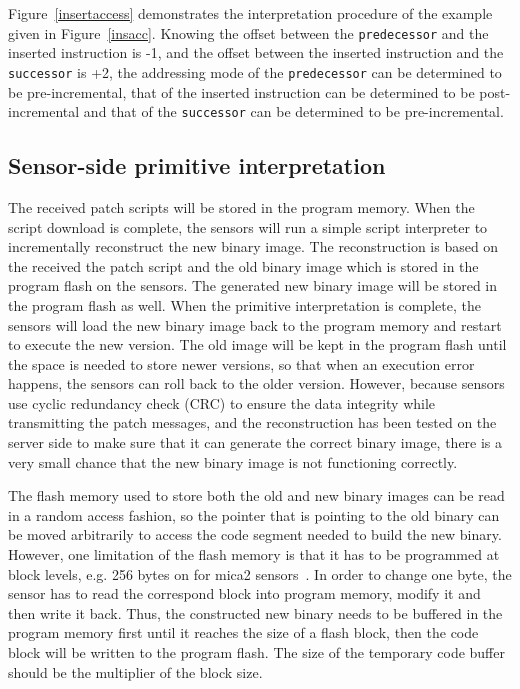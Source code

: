 Figure~\ref{insertaccess} demonstrates the interpretation procedure of the
example given in Figure~\ref{insacc}. Knowing the offset between the {\tt predecessor}
and the inserted instruction is -1, and the offset between the inserted
instruction and the {\tt successor} is +2, the addressing mode of the 
{\tt predecessor} can be determined to be pre-incremental, that of the inserted
instruction can be determined to be post-incremental and that of the
{\tt successor} can be determined to be pre-incremental.

\subsection{Sensor-side primitive interpretation}

The received patch scripts will be stored in the program memory.
When the script download is complete, the sensors will run a simple script
interpreter to incrementally reconstruct the new binary image.
The reconstruction is based on the received the patch script and
the old binary image which is stored in the program flash on the
sensors.
The generated new binary image will be stored in the program flash as well.
When the primitive interpretation is complete, the sensors will load
the new binary image back to the program memory and restart
to execute the new version.
The old image will be kept in the program flash until the space is 
needed to store newer versions, so that when an execution error
happens, the sensors can roll back to the older version.
However, because sensors use cyclic redundancy check (CRC) to ensure the data integrity
while transmitting the patch messages, and the reconstruction
has been tested on the server side to make sure that it can generate
the correct binary image, there is a very small chance that the
new binary image is not functioning correctly.


The flash memory used to store both the old and new binary images
can be read in a random access fashion, so the pointer that is pointing
to the old binary can be moved arbitrarily to access the code segment
needed to build the new binary.
However, one limitation of the flash memory is that it has to be programmed 
at block levels, e.g. 256 bytes on for mica2 sensors~\cite{mica2-power}.
In order to change one byte, the sensor has to read the correspond block into
program memory, modify it and then write it back.
Thus, the constructed new binary needs to be buffered in the program memory
first until it reaches the size of a flash block, then the code block will be
written to the program flash. The size of the temporary code buffer 
should be the multiplier of the block size.


